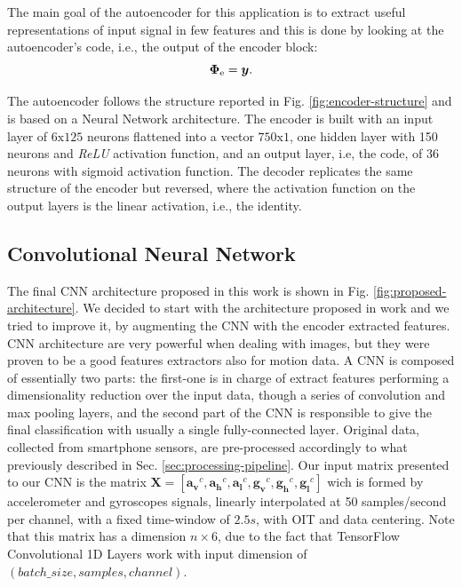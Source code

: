 The main goal of the autoencoder for this application is to extract
useful representations of input signal in few features and this is
done by looking at the autoencoder's code, i.e., the output of the
encoder block:
\begin{equation}
  \boldsymbol{\Phi_{\text{e}}} = \boldsymbol{y}.
\end{equation}



The autoencoder follows the structure reported in
Fig. \ref{fig:encoder-structure} and is based on a Neural Network
architecture. The encoder is built with an input layer of
$6\text{x}125$ neurons flattened into a vector $750\text{x}1$, one hidden
layer with 150 neurons and \textit{ReLU} activation function, and an output
layer, i.e, the code, of $36$ neurons with sigmoid activation
function. The decoder replicates the same structure of the encoder but
reversed, where the activation function on the output layers is the
linear activation, i.e., the identity.

\subsection{Convolutional Neural Network}
\label{subsec:cnn}
The final CNN architecture proposed in this work is shown in Fig. \ref{fig:proposed-architecture}. We decided to start with the architecture proposed in work \cite{ignatov2018real} and we tried to improve it, by augmenting the CNN with the encoder extracted features. CNN architecture are very powerful when dealing with images, but they were proven to be a good features extractors also for motion data. A CNN is composed of essentially two parts: the first-one is in charge of extract features performing a dimensionality reduction over the input data, though a series of convolution and max pooling layers, and the second part of the CNN is responsible to give the final classification with usually a single fully-connected layer. Original data, collected from smartphone sensors, are pre-processed accordingly to what previously described in Sec. \ref{sec:processing-pipeline}. Our input matrix presented to our CNN is the matrix \mbox{$ \boldsymbol{X} = [ \boldsymbol{a_{v}}^{c}, \boldsymbol{a_{h}}^{c}, \boldsymbol{a_{l}}^{c}, \boldsymbol{g_{v}}^{c}, \boldsymbol{g_{h}}^{c}, \boldsymbol{g_{l}}^{c}]$} wich is formed by accelerometer and gyroscopes signals, linearly interpolated at 50 samples/second per channel, with a fixed time-window of $2.5s$, with OIT and data centering. Note that this matrix has a dimension $n \times 6$, due to the fact that TensorFlow Convolutional 1D Layers work with input dimension of $(batch\_size, samples, channel)$.

